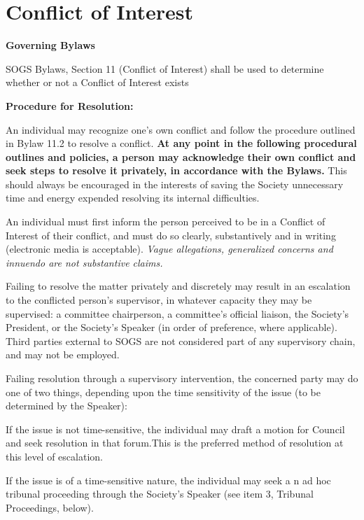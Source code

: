 \section{Conflict of Interest}


\begin{longenum}[ label*=\arabic*., align=left]
\item  \textbf{Governing Bylaws}

	\begin{longenum}[ label*=\arabic*., align=left]
		\item SOGS Bylaws, Section 11 (Conflict of Interest) shall be used to determine whether or not a Conflict of Interest exists
	\end{longenum}
\item \textbf{Procedure for Resolution:}
	\begin{longenum}[ label*=\arabic*., align=left]
		\item An individual may recognize one's own conflict and follow the procedure outlined in Bylaw 11.2 to resolve a conflict. \textbf{At any point in the following procedural outlines and policies, a person may acknowledge their own conflict and seek steps to resolve it privately, in accordance with the Bylaws.} This should always be encouraged in the interests of saving the Society unnecessary time and energy expended resolving its internal difficulties.
        \item An individual must first inform the person perceived to be in a Conflict of Interest of their conflict, and must do so clearly, substantively and in writing (electronic media is acceptable). \textit{Vague allegations, generalized concerns and innuendo are not substantive claims.}
        \item Failing to resolve the matter privately and discretely may result in an escalation to the conflicted person's supervisor, in whatever capacity they may be supervised: a committee chairperson, a committee's official liaison, the Society's President, or the Society's Speaker (in order of preference, where applicable). Third parties external to SOGS are not considered part of any supervisory chain, and may not be employed.
		\item Failing resolution through a supervisory intervention, the concerned party may do one of two things, depending upon the time sensitivity of the issue (to be determined by the Speaker):
		\begin{longenum}[ label*=\arabic*., align=left]
			\item If the issue is not time-sensitive, the individual may draft a motion for Council and seek resolution in that forum.This is the preferred method of resolution at this level of escalation.
            \item If the issue is of a time-sensitive nature, the individual may seek a n ad hoc tribunal proceeding through the Society's Speaker (see item 3, Tribunal Proceedings, below).
            

\end{longenum}
\end{longenum}
\end{longenum}

